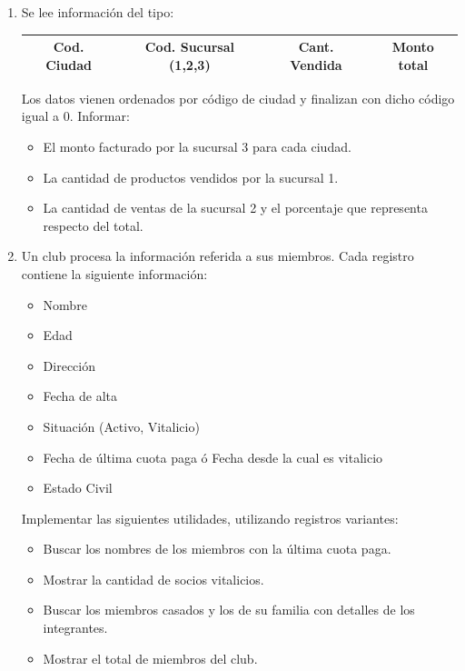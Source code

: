 \documentclass[a4paper,10pt]{article}
\begin{document}
\begin{enumerate}
\item Se lee informaci\'on del tipo:
\begin{table}[h]
\begin{tabular}{|c|c|c|c|}
  \hline
  Cod. Ciudad & Cod. Sucursal (1,2,3) & Cant. Vendida & Monto total\\
  \hline
\end{tabular}
\end{table}

Los datos vienen ordenados por c\'odigo de ciudad y finalizan con dicho c\'odigo igual a 0. Informar:
\begin{itemize}
    \item[a-] El monto facturado por la sucursal 3 para cada ciudad.
    \item[b-] La cantidad de productos vendidos por la sucursal 1.
    \item[c-] La cantidad de ventas de la sucursal 2 y el porcentaje que representa respecto del total.
\end{itemize}

\item Un club procesa la informaci\'on referida a sus miembros. Cada registro contiene la siguiente informaci\'on:
    \begin{itemize}
        \item[-] Nombre
        \item[-] Edad
        \item[-] Direcci\'on
        \item[-] Fecha de alta
        \item[-] Situaci\'on (Activo, Vitalicio)
        \item[-] Fecha de \'ultima cuota paga \'o Fecha desde la cual es vitalicio
        \item[-] Estado Civil
    \end{itemize}

Implementar las siguientes utilidades, utilizando registros variantes:
    \begin{itemize}
      \item[a-] Buscar los nombres de los miembros con la \'ultima cuota paga.
      \item[b-] Mostrar la cantidad de socios vitalicios.
      \item[c-] Buscar los miembros casados y los de su familia con detalles de los integrantes. 
      \item[d-] Mostrar el total de miembros del club.
    \end{itemize}



\end{enumerate}
\end{document}
